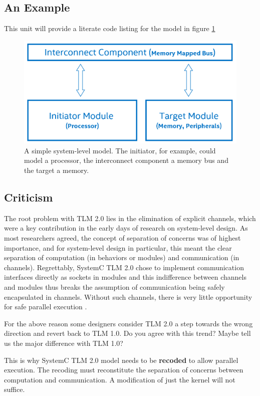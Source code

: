 \documentclass[12pt,twoside]{article}
\begin{document}
\subsection{An Example}
\label{sec-6-5}
This unit will provide a literate code listing for the model in figure \ref{fig:TLM_tutorial}
\begin{figure}[htb]
\centering
\includegraphics[scale=.4]{Figures/TLM_tutorial.png}
\caption{\label{fig:TLM_tutorial}A simple system-level model. The initiator, for example, could model a processor, the interconnect component a memory bus and the target a memory.}
\end{figure}


\subsection{Criticism}
\label{sec-6-6}
The root problem with TLM 2.0 lies in the elimination of explicit channels, which were a key contribution in the early days of research on system-level design.
As most researchers agreed, the concept of separation of concerns was of highest importance, 
and for system-level design in particular, this meant the clear separation of computation (in behaviors or modules) and communication (in channels).
Regrettably, SystemC TLM 2.0 chose to implement communication interfaces directly as sockets in modules and this indifference between channels and modules thus breaks the assumption of communication being safely encapsulated in channels.
Without such channels, there is very little opportunity for safe parallel execution \cite{Liu2015}.

For the above reason some designers consider TLM 2.0 a step towards the wrong direction and revert back to TLM 1.0.
Do you agree with this trend? 
Maybe tell us the major difference with TLM 1.0?

This is why SystemC TLM 2.0 model needs to be \textbf{recoded} to allow parallel execution.
The recoding must reconstitute the separation of concerns between computation and communication.
A modification of just the kernel will not suffice.
\end{document}
